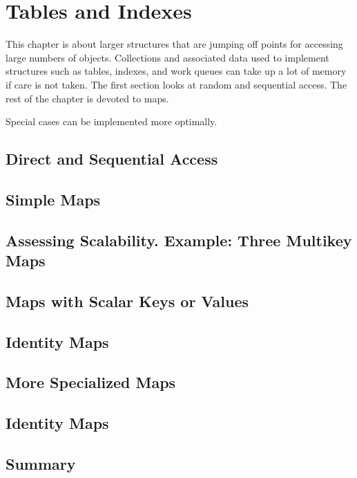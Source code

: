 \chapter{Tables and Indexes}
\label{chapter:tables-indexes}

This chapter is about larger structures that are jumping off points for
accessing large numbers of objects. Collections and associated data used to
implement structures such as tables, indexes, and work queues can take up a lot
of memory if care is not taken. The first section looks at random and sequential access.  The rest of the
chapter is devoted to maps.  

Special cases can be implemented more optimally.

\section{Direct and Sequential Access}

\section{Simple Maps}

\section{Assessing Scalability. Example: Three Multikey Maps}

\section{Maps with Scalar Keys or Values}

\section{Identity Maps}

\section{More Specialized Maps}

\section{Identity Maps}

\section{Summary}

